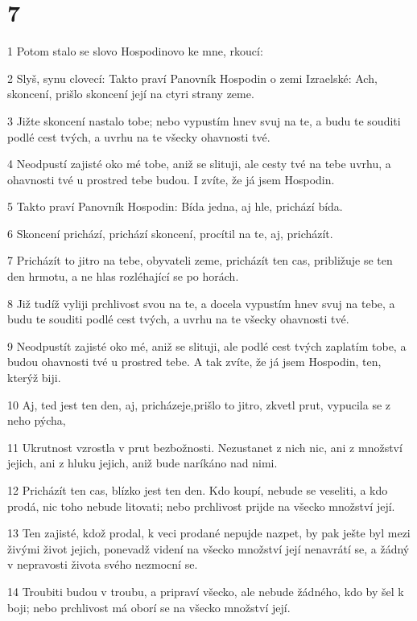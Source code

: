 \chapter{7}

\par 1 Potom stalo se slovo Hospodinovo ke mne, rkoucí:
\par 2 Slyš, synu clovecí: Takto praví Panovník Hospodin o zemi Izraelské: Ach, skoncení, prišlo skoncení její na ctyri strany zeme.
\par 3 Jižte skoncení nastalo tobe; nebo vypustím hnev svuj na te, a budu te souditi podlé cest tvých, a uvrhu na te všecky ohavnosti tvé.
\par 4 Neodpustí zajisté oko mé tobe, aniž se slituji, ale cesty tvé na tebe uvrhu, a ohavnosti tvé u prostred tebe budou. I zvíte, že já jsem Hospodin.
\par 5 Takto praví Panovník Hospodin: Bída jedna, aj hle, prichází bída.
\par 6 Skoncení prichází, prichází skoncení, procítil na te, aj, pricházít.
\par 7 Pricházít to jitro na tebe, obyvateli zeme, pricházít ten cas, približuje se ten den hrmotu, a ne hlas rozléhající se po horách.
\par 8 Již tudíž vyliji prchlivost svou na te, a docela vypustím hnev svuj na tebe, a budu te souditi podlé cest tvých, a uvrhu na te všecky ohavnosti tvé.
\par 9 Neodpustít zajisté oko mé, aniž se slituji, ale podlé cest tvých zaplatím tobe, a budou ohavnosti tvé u prostred tebe. A tak zvíte, že já jsem Hospodin, ten, kterýž biji.
\par 10 Aj, ted jest ten den, aj, pricházeje,prišlo to jitro, zkvetl prut, vypucila se z neho pýcha,
\par 11 Ukrutnost vzrostla v prut bezbožnosti. Nezustanet z nich nic, ani z množství jejich, ani z hluku jejich, aniž bude naríkáno nad nimi.
\par 12 Pricházít ten cas, blízko jest ten den. Kdo koupí, nebude se veseliti, a kdo prodá, nic toho nebude litovati; nebo prchlivost prijde na všecko množství její.
\par 13 Ten zajisté, kdož prodal, k veci prodané nepujde nazpet, by pak ješte byl mezi živými život jejich, ponevadž videní na všecko množství její nenavrátí se, a žádný v nepravosti života svého nezmocní se.
\par 14 Troubiti budou v troubu, a pripraví všecko, ale nebude žádného, kdo by šel k boji; nebo prchlivost má oborí se na všecko množství její.
